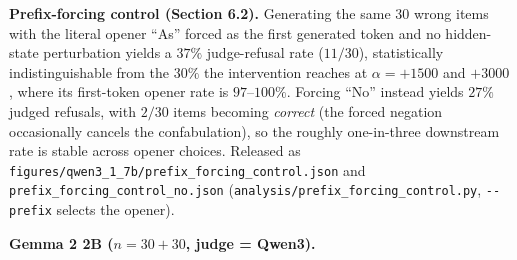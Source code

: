 \textbf{Prefix-forcing control (Section 6.2).} Generating the same
\(30\) wrong items with the literal opener ``As'' forced as the first
generated token and no hidden-state perturbation yields a \(37\%\)
judge-refusal rate (\(11/30\)), statistically indistinguishable from the
\(30\%\) the intervention reaches at \(\alpha = +1500\) and \(+3000\),
where its first-token opener rate is \(97\)--\(100\%\). Forcing ``No''
instead yields \(27\%\) judged refusals, with \(2/30\) items becoming
\emph{correct} (the forced negation occasionally cancels the
confabulation), so the roughly one-in-three downstream rate is stable
across opener choices. Released as
\texttt{figures/qwen3\_1\_7b/prefix\_forcing\_control.json} and
\texttt{prefix\_forcing\_control\_no.json}
(\texttt{analysis/prefix\_forcing\_control.py}, \texttt{-\/-prefix}
selects the opener).

\textbf{Gemma 2 2B (\(n=30 + 30\), judge = Qwen3).}

